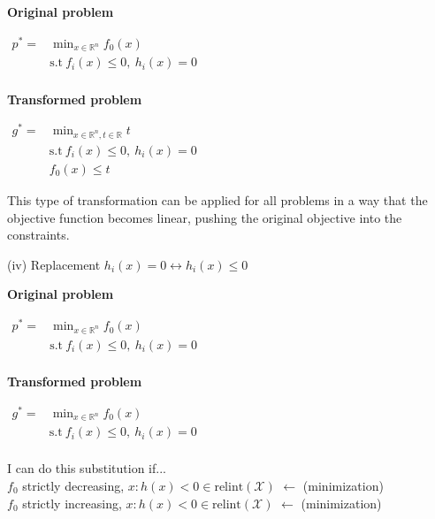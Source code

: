 \documentclass[a4paper]{article}
\begin{document}
\vspace{-0.3cm}
\begin{multicols}{3}
    \noindent
    \textbf{Original problem}
    \begin{center}
        $\begin{aligned}
            p^*=&\min_{x\in\mathbb{R}^n} f_0(x)\\
            &\text{s.t} \ f_i(x)\le 0, \ h_i(x)=0\\
        \end{aligned}$
    \end{center}\newcolumn
    \textbf{Transformed problem}
    \begin{center}
        $\begin{aligned}
            g^*=&\min_{x\in\mathbb{R}^n,t\in\mathbb{R}} {t}\\
            &\text{s.t} \ f_i(x)\le 0, \ h_i(x)=0\\
            &f_0(x)\le{t}
        \end{aligned}$
    \end{center}
    \newcolumn
    This type of transformation can be applied for all problems in a way that the objective function becomes linear, pushing the original objective into the constraints. 
\end{multicols}
\vspace{-0.3cm}
\noindent
\textsf{\large(iv) Replacement $h_i(x)=0 \leftrightarrow h_i(x)\le0$}
\vspace{-0.3cm}
\begin{multicols}{3}
    \noindent
    \textbf{Original problem}
    \begin{center}
        $\begin{aligned}
            p^*=&\min_{x\in\mathbb{R}^n} f_0(x)\\
            &\text{s.t} \ f_i(x)\le 0, \ h_i(x)=0\\
        \end{aligned}$
    \end{center}
    \newcolumn
    \textbf{Transformed problem}
    \begin{center}
        $\begin{aligned}
            g^*=&\min_{x\in\mathbb{R}^n} f_0(x)\\
            &\text{s.t} \ f_i(x)\le 0, \ h_i(x)=0\\
        \end{aligned}$
    \end{center}
    \newcolumn
    \textsf{I can do this substitution if...}\\
    $f_0$ strictly decreasing, ${x: h(x)<0}\in \text{relint}(\mathcal{X})$ $\leftarrow$ (minimization)\\
    $f_0$ strictly increasing, ${x: h(x)<0}\in \text{relint}(\mathcal{X})$ $\leftarrow$ (minimization)\\
\end{multicols}
\end{document}
